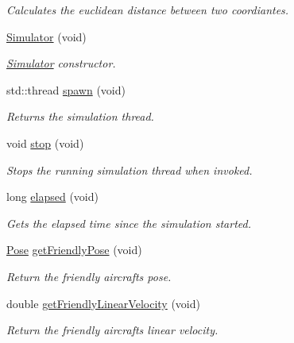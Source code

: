\begin{DoxyCompactItemize}
\begin{DoxyCompactList}\small\item\em Calculates the euclidean distance between two coordiantes. \end{DoxyCompactList}\item 
\hyperlink{classSimulator_a62ab66763cb9e6cccbe88d45ab55547f}{Simulator} (void)
\begin{DoxyCompactList}\small\item\em \hyperlink{classSimulator}{Simulator} constructor. \end{DoxyCompactList}\item 
std\+::thread \hyperlink{classSimulator_a19ad57d2e32486e1cce2d8702060d930}{spawn} (void)
\begin{DoxyCompactList}\small\item\em Returns the simulation thread. \end{DoxyCompactList}\item 
\mbox{\label{classSimulator_ae88ecc16eb03836e8b4a355836d7500b}} 
void \hyperlink{classSimulator_ae88ecc16eb03836e8b4a355836d7500b}{stop} (void)
\begin{DoxyCompactList}\small\item\em Stops the running simulation thread when invoked. \end{DoxyCompactList}\item 
long \hyperlink{classSimulator_acd0a0ca3e9d25ea92ffc05e14b77c5e6}{elapsed} (void)
\begin{DoxyCompactList}\small\item\em Gets the elapsed time since the simulation started. \end{DoxyCompactList}\item 
\hyperlink{structPose}{Pose} \hyperlink{classSimulator_ab498029a37713969af417acfa7208d08}{get\+Friendly\+Pose} (void)
\begin{DoxyCompactList}\small\item\em Return the friendly aircraft\textquotesingle{}s pose. \end{DoxyCompactList}\item 
double \hyperlink{classSimulator_a17d07e629ef87450d91d960c2e6b231e}{get\+Friendly\+Linear\+Velocity} (void)
\begin{DoxyCompactList}\small\item\em Return the friendly aircraft\textquotesingle{}s linear velocity. \end{DoxyCompactList}\item 

\end{DoxyCompactItemize}
